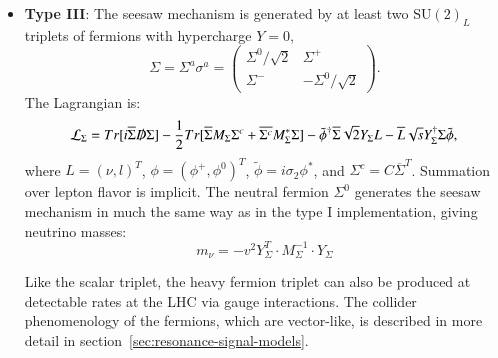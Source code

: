 \begin{itemize}
	\item \textbf{Type III}: The seesaw mechanism is generated by at least two $\mathrm{SU}(2)_L$ triplets of fermions with hypercharge $Y=0$,
	\begin{equation}
		\Sigma = \Sigma^a \sigma^a = \left(\begin{array}{cc} \Sigma^0/\sqrt{2} & \Sigma^+ \\ \Sigma^- & -\Sigma^0/\sqrt{2} \end{array}\right). 
	\end{equation}
	The Lagrangian is:
	\begin{equation}
		\mathcal{L}_{\Sigma} = Tr[i\overline{\Sigma}\slashed{D}\Sigma] - \frac12 Tr[\overline{\Sigma}M_{\Sigma}\Sigma^c+\overline{\Sigma^c}M_{\Sigma}^{*}\Sigma] - \tilde{\phi}^{\dagger}\overline{\Sigma}\sqrt{2}Y_{\Sigma}L - \overline{L}\sqrt{s}Y_{\Sigma}^{\dagger}\Sigma \tilde{\phi},
	\end{equation}
	where $L=(\nu,l)^T$, $\phi=(\phi^+, \phi^0)^T$, $\tilde{\phi}=i\sigma_2\phi^{*}$, and $\Sigma^c=C\overline{\Sigma}^T$. Summation over lepton flavor is implicit. The neutral fermion $\Sigma^0$ generates the seesaw mechanism in much the same way as in the type I implementation, giving neutrino masses:
	\begin{equation}
		m_{\nu} = -v^2 Y_{\Sigma}^T \cdot M_{\Sigma}^{-1} \cdot Y_{\Sigma}
	\end{equation}
	
	Like the scalar triplet, the heavy fermion triplet can also be produced at detectable rates at the LHC via gauge interactions. The collider phenomenology of the fermions, which are vector-like, is described in more detail in section~\ref{sec:resonance-signal-models}. 
\end{itemize}

\printbibliography